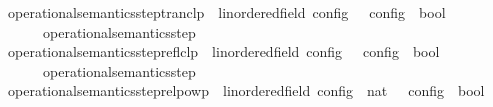 \begin{isabellebody}
\isanewline
{}\isamarkupfalse%
\ operational{\isacharunderscore}semantics{\isacharunderscore}step{\isacharunderscore}tranclp\ {\isacharcolon}{\isacharcolon}\ {\isachardoublequoteopen}{\isacharparenleft}{\isacharprime}{\isasymtau}{\isacharcolon}{\isacharcolon}linordered{\isacharunderscore}field{\isacharparenright}\ config\ {\isasymRightarrow}\ {\isacharprime}{\isasymtau}\ config\ {\isasymRightarrow}\ bool{\isachardoublequoteclose}\ {\isacharparenleft}{\isachardoublequoteopen}{\isacharunderscore}\ {\isasymhookrightarrow}\isactrlsup {\isacharplus}\isactrlsup {\isacharplus}\ {\isacharunderscore}{\isachardoublequoteclose}\ {}{}{\isacharparenright}\ \isanewline
\ \ {\isachardoublequoteopen}{\isasymC}\ {\isasymhookrightarrow}\isactrlsup {\isacharplus}\isactrlsup {\isacharplus}\ {\isasymC}\ {\isasymequiv}\ operational{\isacharunderscore}semantics{\isacharunderscore}step\isactrlsup {\isacharplus}\isactrlsup {\isacharplus}\ {\isasymC}\ {\isasymC}\isanewline
\isanewline
{}\isamarkupfalse%
\ operational{\isacharunderscore}semantics{\isacharunderscore}step{\isacharunderscore}reflclp\ {\isacharcolon}{\isacharcolon}\ {\isachardoublequoteopen}{\isacharparenleft}{\isacharprime}{\isasymtau}{\isacharcolon}{\isacharcolon}linordered{\isacharunderscore}field{\isacharparenright}\ config\ {\isasymRightarrow}\ {\isacharprime}{\isasymtau}\ config\ {\isasymRightarrow}\ bool{\isachardoublequoteclose}\ {\isacharparenleft}{\isachardoublequoteopen}{\isacharunderscore}\ {\isasymhookrightarrow}\isactrlsup {\isacharequal}\isactrlsup {\isacharequal}\ {\isacharunderscore}{\isachardoublequoteclose}\ {}{}{\isacharparenright}\ \isanewline
\ \ {\isachardoublequoteopen}{\isasymC}\ {\isasymhookrightarrow}\isactrlsup {\isacharequal}\isactrlsup {\isacharequal}\ {\isasymC}\ {\isasymequiv}\ operational{\isacharunderscore}semantics{\isacharunderscore}step\isactrlsup {\isacharequal}\isactrlsup {\isacharequal}\ {\isasymC}\ {\isasymC}\isanewline
\isanewline
{}\isamarkupfalse%
\ operational{\isacharunderscore}semantics{\isacharunderscore}step{\isacharunderscore}relpowp\ {\isacharcolon}{\isacharcolon}\ {\isachardoublequoteopen}{\isacharparenleft}{\isacharprime}{\isasymtau}{\isacharcolon}{\isacharcolon}linordered{\isacharunderscore}field{\isacharparenright}\ config\ {\isasymRightarrow}\ nat\ {\isasymRightarrow}\ {\isacharprime}{\isasymtau}\ config\ {\isasymRightarrow}\ bool{\isachardoublequoteclose}\ {\isacharparenleft}{\isachardoublequoteopen}{\isacharunderscore}\ {\isasymhookrightarrow}\isactrlbsup {\isacharunderscore}\isactrlesup \ {\isacharunderscore}{\isachardoublequoteclose}\ {}{}{\isacharparenright}\ \isanewline

\end{isabellebody}
